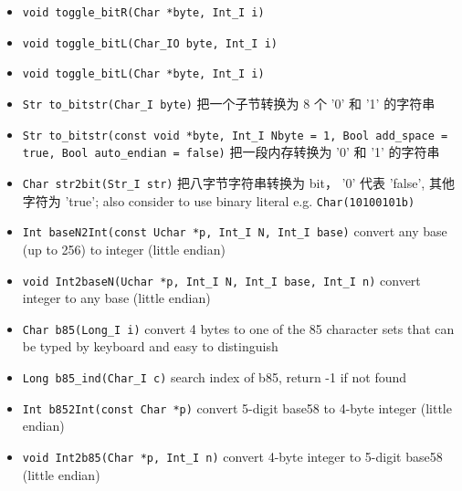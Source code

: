 \begin{itemize}
\item \verb`void toggle_bitR(Char *byte, Int_I i)`
\item \verb`void toggle_bitL(Char_IO byte, Int_I i)`
\item \verb`void toggle_bitL(Char *byte, Int_I i)`
\item \verb`Str to_bitstr(Char_I byte)` 把一个子节转换为 8 个 '0' 和 '1' 的字符串
\item \verb`Str to_bitstr(const void *byte, Int_I Nbyte = 1, Bool add_space = true, Bool auto_endian = false)` 把一段内存转换为 '0' 和 '1' 的字符串
\item \verb`Char str2bit(Str_I str)` 把八字节字符串转换为 bit， '0' 代表 'false', 其他字符为 'true'; also consider to use binary literal e.g. \verb`Char(10100101b)`
\item \verb`Int baseN2Int(const Uchar *p, Int_I N, Int_I base)` convert any base (up to 256) to integer (little endian)
\item \verb`void Int2baseN(Uchar *p, Int_I N, Int_I base, Int_I n)` convert integer to any base (little endian)
\item \verb`Char b85(Long_I i)` convert 4 bytes to one of the 85 character sets that can be typed by keyboard and easy to distinguish
\item \verb`Long b85_ind(Char_I c)` search index of b85, return -1 if not found
\item \verb`Int b852Int(const Char *p)` convert 5-digit base58 to 4-byte integer (little endian)
\item \verb`void Int2b85(Char *p, Int_I n)` convert 4-byte integer to 5-digit base58 (little endian)
\end{itemize}
